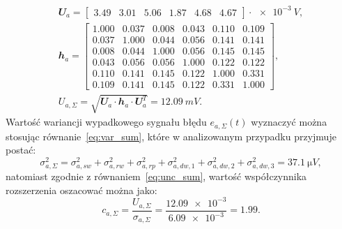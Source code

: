 \begin{gather}
\mathbfit{U}_{a} =
\begin{bmatrix}
\num{3.49} & \num{3.01} & \num{5.06} & \num{1.87} & \num{4.68} & \num{4.67}
\end{bmatrix} \cdot \qty{e-3}{V}
\label{eq:sym_parta_uncert_vector_val}, \\
\mathbfit{h}_{a} =
\begin{bmatrix}
\num{1.000} & \num{0.037} & \num{0.008} & \num{0.043} & \num{0.110} & \num{0.109} \\
\num{0.037} & \num{1.000} & \num{0.044} & \num{0.056} & \num{0.141} & \num{0.141} \\
\num{0.008} & \num{0.044} & \num{1.000} & \num{0.056} & \num{0.145} & \num{0.145} \\
\num{0.043} & \num{0.056} & \num{0.056} & \num{1.000} & \num{0.122} & \num{0.122} \\
\num{0.110} & \num{0.141} & \num{0.145} & \num{0.122} & \num{1.000} & \num{0.331} \\
\num{0.109} & \num{0.141} & \num{0.145} & \num{0.122} & \num{0.331} & \num{1.000}
\end{bmatrix}
\label{eq:sym_parta_uncert_coher_val}, \\
U_{a,\Sigma} = \sqrt{\mathbfit{U}_{a} \cdot \mathbfit{h}_{a} \cdot \mathbfit{U}_{a}^{T}} = \qty{12.09}{mV} \label{eq:sym_parta_uncert_value_a}.
\end{gather}
Wartość wariancji wypadkowego sygnału błędu $e_{a,\Sigma}(t)$ wyznaczyć można stosując równanie~\eqref{eq:var_sum}, które w analizowanym przypadku przyjmuje postać:
\begin{equation}
\sigma_{a,\Sigma}^{2} = \sigma_{a,sw}^{2} + \sigma_{a,rw}^{2} + \sigma_{a,rp}^{2} + \sigma_{a,dw,1}^{2} + \sigma_{a,dw,2}^{2} + \sigma_{a,dw,3}^{2} = \qty{37.1}{\micro V} \label{eq:sym_parta_var_sum},
\end{equation}
natomiast zgodnie z równaniem~\eqref{eq:unc_sum}, wartość współczynnika rozszerzenia oszacować można jako:
\begin{equation}
c_{a,\Sigma} = \frac{U_{a,\Sigma}}{\sigma_{a,\Sigma}} = \frac{\num{12.09e-3}}{\num{6.09e-3}} = \num{1.99} \label{eq:sym_parta_uncert_factor}.
\end{equation}


